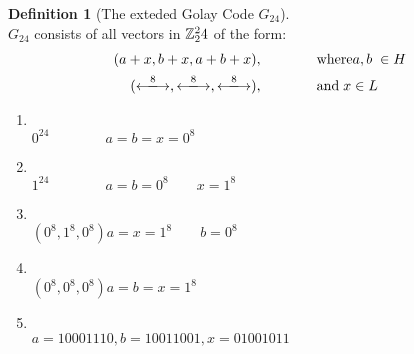 \documentclass[]{amsart}
\theoremstyle{definition}
\newtheorem{defn}[thm]{Definition}
\theoremstyle{remark}
\numberwithin{equation}{section}
\begin{document}
\begin{defn}[The exteded Golay Code $G_24$]\hfill\\
$G_24$ consists of all vectors in $\mathbb{Z}_2^24$ of the form:
\begin{align*}
(a +x, b +x, a + b + x), \qquad&\qquad \text{where} a,b\;\in H\\
(\xlongleftrightarrow{8}, \xlongleftrightarrow{8}, \xlongleftrightarrow{8}), \qquad&\qquad \text{and}\;x\in L\\
\end{align*}

\begin{enumerate}
	\item\hfill\\
	$0^24\qquad \qquad a = b = x = 0^8$
	\item\hfill\\
	$1^24\qquad \qquad a = b = 0^8 \qquad x = 1^8$
	\item\hfill\\
	$(0^8, 1^8, 0^8) a =x = 1^8 \qquad b=0^8$
	\item\hfill\\
	$(0^8, 0^8, 0^8) a = b =x = 1^8$
	\item\hfill\\
	$a = 10001110, b = 10011001, x = 01001011$
\end{enumerate}
\end{defn}
\end{document}
